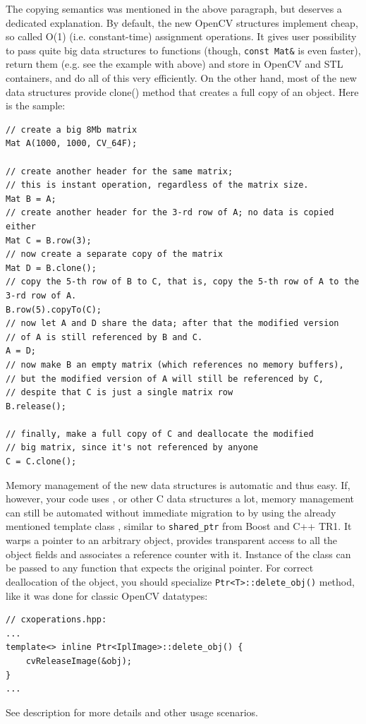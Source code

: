 The copying semantics was mentioned in the above paragraph, but deserves a dedicated explanation.
By default, the new OpenCV structures implement cheap, so called O(1) (i.e. constant-time) assignment operations. It gives user possibility to pass quite big data structures to functions (though, \texttt{const Mat\&} is even faster), return them (e.g. see the example with  above) and store in OpenCV and STL containers, and do all of this very efficiently. On the other hand, most of the new data structures provide clone()
method that creates a full copy of an object. Here is the sample:
\begin{lstlisting}
// create a big 8Mb matrix
Mat A(1000, 1000, CV_64F);

// create another header for the same matrix;
// this is instant operation, regardless of the matrix size.
Mat B = A;
// create another header for the 3-rd row of A; no data is copied either
Mat C = B.row(3);
// now create a separate copy of the matrix
Mat D = B.clone();
// copy the 5-th row of B to C, that is, copy the 5-th row of A to the 3-rd row of A.
B.row(5).copyTo(C);
// now let A and D share the data; after that the modified version
// of A is still referenced by B and C.
A = D;
// now make B an empty matrix (which references no memory buffers),
// but the modified version of A will still be referenced by C,
// despite that C is just a single matrix row
B.release(); 
             
// finally, make a full copy of C and deallocate the modified
// big matrix, since it's not referenced by anyone
C = C.clone();
\end{lstlisting}

Memory management of the new data structures is automatic and thus easy. If, however, your code uses ,
 or other C data structures a lot, memory management can still be automated without immediate migration
to  by using the already mentioned template class , similar to \texttt{shared\_ptr} from Boost and C++ TR1.
It warps a pointer to an arbitrary object, provides transparent access to all the object fields and associates a reference counter with it.
Instance of the class can be passed to any function that expects the original pointer. For correct deallocation of the object, you should specialize \texttt{Ptr<T>::delete\_obj()} method, like it was done for classic OpenCV datatypes:
\begin{lstlisting}
// cxoperations.hpp:
...
template<> inline Ptr<IplImage>::delete_obj() {
    cvReleaseImage(&obj);
}
...
\end{lstlisting}
See  description for more details and other usage scenarios.


